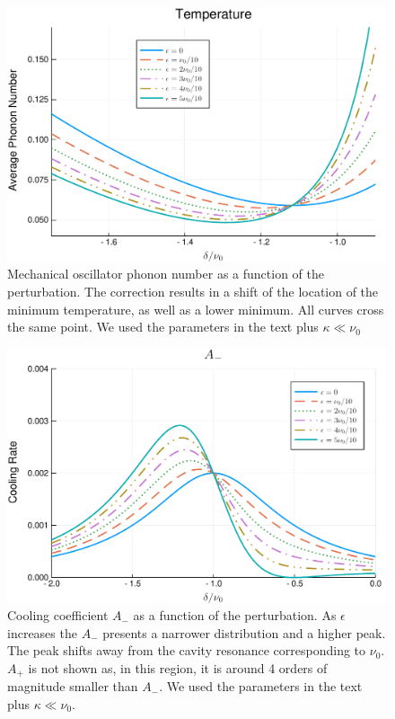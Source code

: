 \documentclass[reprint, amsmath,amssymb, aps,pra]{revtex4-1}
\begin{document}
\begin{figure}
\includegraphics[scale=.4]{GraficaTemp.pdf}  
\caption{ Mechanical oscillator phonon number as a function of the
  perturbation. The correction results in a shift of the location of
  the minimum temperature, as well as a lower minimum. All curves
  cross the same point. We used the parameters in the text plus
  $\kappa \ll \nu_0$}
\label{GraficaTemp}
\end{figure}

\begin{figure}
\includegraphics[scale=.4]{GraficaA-.pdf}
\caption{Cooling coefficient $A_-$ as a function of the perturbation.
  As $\epsilon$ increases the $A_-$ presents a narrower distribution
  and a higher peak. The peak shifts away from the cavity resonance
  corresponding to $\nu_0$. $A_+$ is not shown as, in this region, it
  is around 4 orders of magnitude smaller than $A_-$. We used the
  parameters in the text plus $\kappa \ll \nu_0$.}
\label{GraficaA-}
\end{figure}
\end{document}
